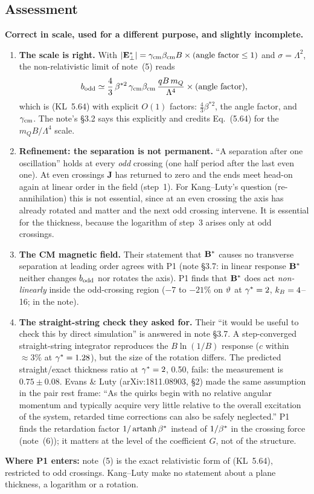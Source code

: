 \documentclass[11pt]{article}
\newcommand{\vhead}[1]{\noindent\textbf{\textsf{#1}}\par\smallskip}
\begin{document}
\subsection{Assessment}
\begin{verdict}
\vhead{Correct in scale, used for a different purpose, and slightly incomplete.}
\begin{enumerate}[leftmargin=*]
\item \textbf{The scale is right.} With $|\mathbf{E}^*_\perp|=\gamma_{\rm cm}\beta_{\rm cm}B\times(\text{angle factor}\le1)$
  and $\sigma=\Lambda^2$, the non-relativistic limit of note~(5) reads
  \[
    b_{\rm odd}\simeq\frac43\,\beta^{*2}\,\gamma_{\rm cm}\beta_{\rm cm}\,\frac{qB\,m_Q}{\Lambda^4}\times(\text{angle factor}),
  \]
  which is (KL~5.64) with explicit $O(1)$ factors: $\tfrac43\beta^{*2}$, the angle factor, and $\gamma_{\rm cm}$.
  The note's \S3.2 says this explicitly and credits Eq.~(5.64) for the $m_QB/\Lambda^4$ scale.
\item \textbf{Refinement: the separation is not permanent.} ``A separation after one oscillation'' holds at
  every \emph{odd} crossing (one half period after the last even one). At even crossings $\mathbf J$ has returned to zero
  and the ends meet head-on again at linear order in the field (step~1). For Kang--Luty's question (re-annihilation) this
  is not essential, since at an even crossing the axis has already rotated and matter and the next odd crossing intervene. It is
  essential for the thickness, because the logarithm of step~3 arises only at odd crossings.
\item \textbf{The CM magnetic field.} Their statement that $\mathbf{B}^*$ causes no transverse separation at leading order agrees
  with P1 (note \S3.7: in linear response $\mathbf{B}^*$ neither changes $b_{\rm odd}$ nor rotates the axis). P1 finds that $\mathbf{B}^*$
  does act \emph{non-linearly} inside the odd-crossing region ($-7$ to $-21\%$ on $\vartheta$ at $\gamma^*=2$, $k_B=4$--16; \EST{}
  in the note).
\item \textbf{The straight-string check they asked for.} Their ``it would be useful to check this by direct simulation''
  is answered in note \S3.7. A step-converged straight-string integrator reproduces the $B\ln(1/B)$ response ($c$ within
  $\approx3\%$ at $\gamma^*=1.28$), but the size of the rotation differs. The predicted straight/exact thickness ratio at $\gamma^*=2$, 0.50, fails:
  the measurement is $0.75\pm0.08$. Evans \& Luty (arXiv:1811.08903, \S2) made the same assumption in the pair rest frame:
  ``As the quirks begin with no relative angular momentum and typically acquire very little relative to the overall
  excitation of the system, retarded time corrections can also be safely neglected.'' P1 finds the retardation factor
  $1/\operatorname{artanh}\beta^*$ instead of $1/\beta^*$ in the crossing force (note~(6)); it matters at the level of
  the coefficient $G$, not of the structure.
\end{enumerate}
\textbf{Where P1 enters:} note~(5) is the exact relativistic form of (KL~5.64), restricted to odd crossings. Kang--Luty
make no statement about a plane thickness, a logarithm or a rotation.
\end{verdict}
\end{document}
